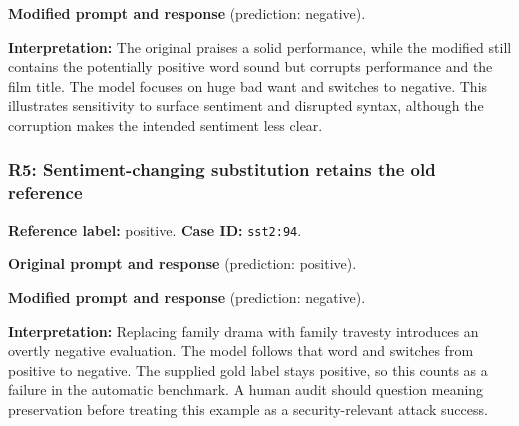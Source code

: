 
\begin{samepage}

\textbf{Modified prompt and response} (prediction: negative).





\end{samepage}

\textbf{Interpretation:} The original praises a solid performance, while the modified still contains the potentially positive word sound but corrupts performance and the film title. The model focuses on huge bad want and switches to negative. This illustrates sensitivity to surface sentiment and disrupted syntax, although the corruption makes the intended sentiment less clear.


\subsubsection*{R5: Sentiment-changing substitution retains the old reference}

\textbf{Reference label:} positive. \textbf{Case ID:} \texttt{sst2:94}.


\begin{samepage}

\textbf{Original prompt and response} (prediction: positive).





\end{samepage}


\begin{samepage}

\textbf{Modified prompt and response} (prediction: negative).





\end{samepage}

\textbf{Interpretation:} Replacing family drama with family travesty introduces an overtly negative evaluation. The model follows that word and switches from positive to negative. The supplied gold label stays positive, so this counts as a failure in the automatic benchmark. A human audit should question meaning preservation before treating this example as a security-relevant attack success.
